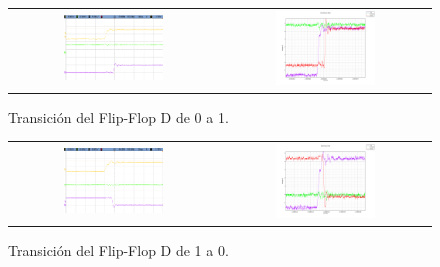 \begin{figure}[H]
    \centering
    \begin{tabular}{c c}
        \includegraphics[width=0.5\textwidth]{../EJ6/Recursos/ffd_rise_osc} &
        \includegraphics[width=0.5\textwidth]{../EJ6/Recursos/ffd_rise}
    \end{tabular}
    \caption{Transición del Flip-Flop D de 0 a 1.}
    \label{fig:ffd_rise_ex6}
\end{figure}

\begin{figure}[H]
    \centering
    \begin{tabular}{c c}
        \includegraphics[width=0.5\textwidth]{../EJ6/Recursos/ffd_fall_osc} &
        \includegraphics[width=0.5\textwidth]{../EJ6/Recursos/ffd_fall}
    \end{tabular}
    \caption{Transición del Flip-Flop D de 1 a 0.}
    \label{fig:ffd_fall_ex6}
\end{figure}

